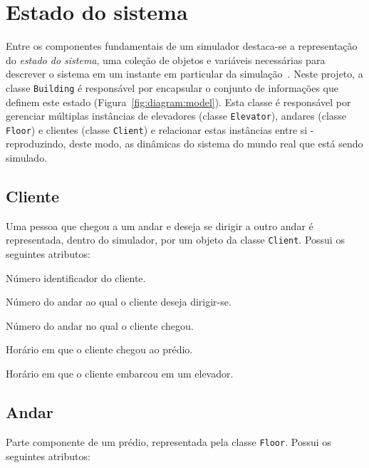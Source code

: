 \section{Estado do sistema}

Entre os componentes fundamentais de um simulador destaca-se a representação do
\textit{estado do sistema}, uma coleção de objetos e variáveis necessárias para
descrever o sistema em um instante em particular da simulação~\cite{Law}. Neste
projeto, a classe \texttt{Building} é responsável por encapsular o conjunto de
informações que definem este estado (Figura~\ref{fig:diagram:model}). Esta
classe é responsável por gerenciar múltiplas instâncias de elevadores (classe
\texttt{Elevator}), andares (classe \texttt{Floor}) e clientes (classe
\texttt{Client}) e relacionar estas instâncias entre si - reproduzindo, deste
modo, as dinâmicas do sistema do mundo real que está sendo simulado.

\subsection{Cliente} \label{model:state:client}
  Uma pessoa que chegou a um andar e deseja se dirigir a outro andar é
  representada, dentro do simulador, por um objeto da classe \texttt{Client}.
  Possui os seguintes atributos:

  \begin{description}[leftmargin=!,labelwidth=\widthof{\bfseries arrivalFloor}]\setlength\itemsep{0mm}
    \item[\texttt{id}] Número identificador do cliente.
    \item[\texttt{destination}] Número do andar ao qual o cliente deseja dirigir-se.
    \item[\texttt{arrivalFloor}] Número do andar no qual o cliente chegou.
    \item[\texttt{createTime}] Horário em que o cliente chegou ao prédio.
    \item[\texttt{pickupTime}] Horário em que o cliente embarcou em um elevador.
  \end{description}

\subsection{Andar} \label{model:floor}

Parte componente de um prédio, representada pela classe \texttt{Floor}. Possui
os seguintes atributos:

